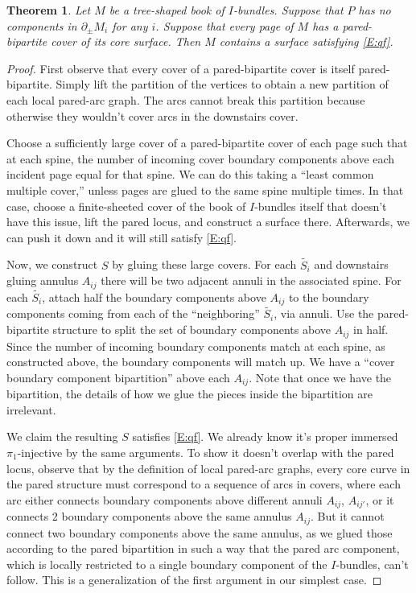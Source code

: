 \documentclass[12pt]{amsart}
\newtheorem{thm}[theorem]{Theorem}
\theoremstyle{definition}
\theoremstyle{remark}
\newcommand{\bd}{\partial}
\begin{document}
\begin{thm}

Let $M$ be a tree-shaped book of $I$-bundles. Suppose that $P$ has no
components in $\bd_\pm M_i$ for any $i$. Suppose that every page of $M$
has a pared-bipartite cover of its core surface. Then $M$ contains a surface
satisfying \eqref{E:qf}.

\end{thm}
\begin{proof}

First observe that every cover of a pared-bipartite cover is itself
pared-bipartite. Simply lift the partition of the vertices to obtain a new
partition of each local pared-arc graph. The arcs cannot break this
partition because otherwise they wouldn't cover arcs in the downstairs cover.

Choose a sufficiently large cover of a pared-bipartite cover of each page such
that at each spine, the number of incoming cover boundary components above each
incident page equal for that spine. We can do this taking a ``least common
multiple cover,'' unless pages are glued to the same spine multiple times. In
that case, choose a finite-sheeted cover of the book of $I$-bundles itself that
doesn't have this issue, lift the pared locus, and construct a surface there.
Afterwards, we can push it down and it will still satisfy \eqref{E:qf}.


Now, we construct $S$ by gluing these large covers. For each $\widetilde{S_i}$
and downstairs gluing annulus $A_{ij}$ there will be two adjacent annuli in the
associated spine. For each $\widetilde{S_i}$, attach half the boundary
components above $A_{ij}$ to the boundary components coming from each of the
``neighboring'' $\widetilde{S_i}$, via annuli. Use the pared-bipartite
structure to split the set of boundary components above $A_{ij}$ in half. Since
the number of incoming boundary components match at each spine, as constructed
above, the boundary components will match up. We have a ``cover boundary
component bipartition'' above each $A_{ij}$. Note that once we have the
bipartition, the details of how we glue the pieces inside the bipartition are
irrelevant.

We claim the resulting $S$ satisfies \eqref{E:qf}. We already know it's proper
immersed $\pi_1$-injective by the same arguments. To show it doesn't overlap
with the pared locus, observe that by the definition of local pared-arc graphs,
every core curve in the pared structure must correspond to a sequence of arcs
in covers, where each arc either connects boundary components above different
annuli $A_{ij}$, $A_{ij'}$, or it connects 2 boundary components above the same
annulus $A_{ij}$. But it cannot connect two boundary components above the same
annulus, as we glued those according to the pared bipartition in such a way
that the pared arc component, which is locally restricted to a single boundary
component of the $I$-bundles, can't follow. This is a generalization of the
first argument in our simplest case.


\end{proof}
\end{document}
